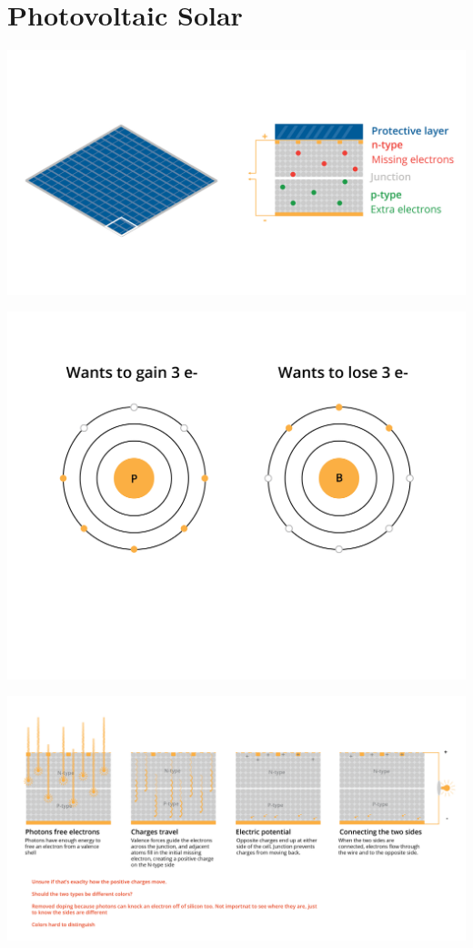\section{Photovoltaic Solar}


\includegraphics[width=.75\textwidth]{solarDiagram.png}

\includegraphics[width=.75\textwidth]{atomSolar.png}

\includegraphics[width=.75\textwidth]{solarProcess.png}


